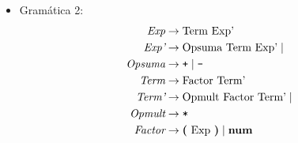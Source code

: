 \documentclass[12pt,letterpaper]{article}
\newcommand{\nt}[1]{\textit{#1}}
\newcommand{\tk}[1]{\texttt{#1}}
\newcommand{\tx}[1]{\text{#1}}
\newcommand{\First}[1]{\mathrm{FIRST}(#1)}
\newcommand{\Follow}[1]{\mathrm{FOLLOW}(#1)}
\begin{document}
\begin{enumerate}[label=\arabic*.]
\begin{itemize}
    \newpage
    
    \textbf{Paso 5. Tabla LL(1)}
    \[
    \begin{array}{c|c|c|c|c|c|c|c|c|c|c}
      & \tk{a} & \tk{b} & \tk{c} & \tk{d} & \tk{e} & \tk{f} & \tk{g} & \tk{h} & \tk{i} & \tk{\$} \\ \hline
      \nt{A} & 1 &   & 1 &   & 1 &   & 1 &   & 1 &   \\ \hline
      \nt{B} & 2 &   & 3 &   & 3 & 3 & 3 &   & 3 &   \\ \hline
      \nt{C} &   & 7 & 4 &   & 5 &   & 6 &   & 7 &   \\ \hline
      \nt{D} &   &   &   &   &   &   &   &   & 8 &   \\
    \end{array}
    \]

    Ninguna celda tiene más de una producción, en particular, para \nt{B}:\\
    $\First{\tk{a}\,\nt{C}\,\tk{b}}=\{\tk{a}\}$ y $\Follow{\nt{B}}=\{\tk{c},\tk{e},\tk{g},\tk{i},\tk{f}\}$
    son disjuntos.\\
    Para \nt{C}:
    $\{\tk{c},\tk{e},\tk{g}\}\cap\Follow{\nt{C}}=\{\tk{c},\tk{e},\tk{g}\}\cap\{\tk{i},\tk{b}\}=\varnothing$.\\
    
    \textbf{La Gramática 1 es LL(1).}

    
    \bigskip

    
  \item Gramática 2:
    \[
    \begin{aligned}
      \nt{Exp}    &\to \tx{Term}\ \tx{Exp'} \\
      \nt{Exp'}   &\to \tx{Opsuma}\ \tx{Term}\ \tx{Exp'} \mid \\
      \nt{Opsuma} &\to \tk{+} \mid \tk{-} \\
      \nt{Term}   &\to \tx{Factor}\ \tx{Term'} \\
      \nt{Term'}  &\to \tx{Opmult}\ \tx{Factor}\ \tx{Term'} \mid \\
      \nt{Opmult} &\to \tk{*} \\
      \nt{Factor} &\to \textbf{(}\ \tx{Exp}\ \textbf{)} \mid \bf{num}
    \end{aligned}
    \]

    \bigskip


\end{itemize}
\end{enumerate}
\end{document}
